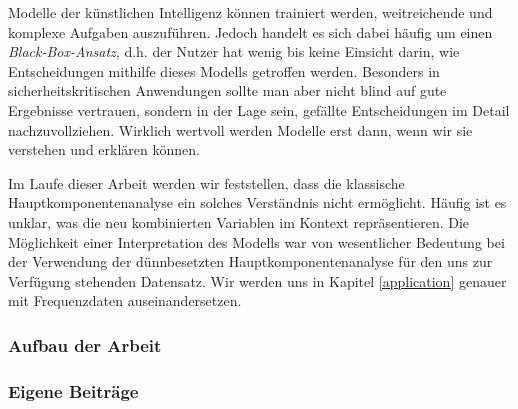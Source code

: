 Modelle der künstlichen Intelligenz können trainiert werden, weitreichende und komplexe Aufgaben auszuführen. Jedoch handelt es sich dabei häufig um einen \textit{Black-Box-Ansatz}, d.h. der Nutzer hat wenig bis keine Einsicht darin, wie Entscheidungen mithilfe dieses Modells getroffen werden. Besonders in sicherheitskritischen Anwendungen sollte man aber nicht blind auf gute Ergebnisse vertrauen, sondern in der Lage sein, gefällte Entscheidungen im Detail nachzuvollziehen. Wirklich wertvoll werden Modelle erst dann, wenn wir sie verstehen und erklären können.

Im Laufe dieser Arbeit werden wir feststellen, dass die klassische Hauptkomponentenanalyse ein solches Verständnis nicht ermöglicht. Häufig ist es unklar, was die neu kombinierten Variablen im Kontext repräsentieren. Die Möglichkeit einer Interpretation des Modells war von wesentlicher Bedeutung bei der Verwendung der dünnbesetzten Hauptkomponentenanalyse für den uns zur Verfügung stehenden Datensatz. Wir werden uns in Kapitel \ref{application} genauer mit Frequenzdaten auseinandersetzen.




\subsubsection{Aufbau der Arbeit}




\subsubsection{Eigene Beiträge}

